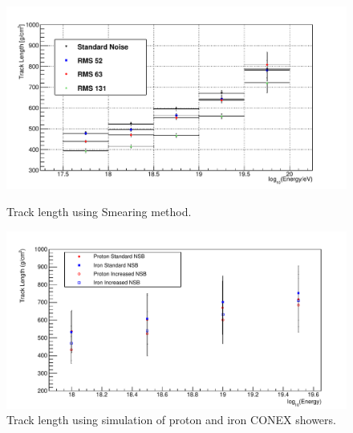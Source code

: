 \begin{figure}
\centering
\includegraphics[width=\textwidth]{chapters/graphs/SelectionEff/Smearing_TrackLength_DiffNSBlevels.pdf}
\caption{Track length using Smearing method.} \label{fig:TrackLength_Smearing}
\vspace{3mm}
\includegraphics[width=\textwidth]{chapters/graphs/SelectionEff/Simulation_TrackLength_Comb_StandANdIncreasedNSB.pdf}
\caption{Track length using simulation of proton and iron CONEX showers.} \label{fig:TrackLength_Sim}
\end{figure}
